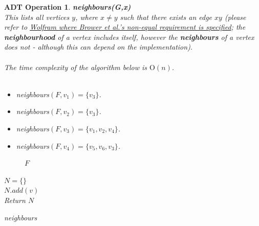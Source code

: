 \documentclass[11pt,reqno]{amsart}
\newtheorem{oper}[thm]{ADT Operation}
\theoremstyle{definition}
\numberwithin{equation}{section}
\begin{document}
\newpage
\begin{oper}
	\textbf{neighbours(G,x)}\\
	This lists all vertices $y$, where $x \neq y$ such that there exists an edge $xy$ (please refer to \href{https://mathworld.wolfram.com/GraphNeighborhood.html}{Wolfram where Brower et al.'s non-equal requirement is specified}; the \textbf{neighbourhood} of a vertex includes itself, however the \textbf{neighbours} of a vertex does not - although this can depend on the implementation).\\
	\\
	The time complexity of the algorithm below is $\mathrm{O}(n)$.\\
	\\
	
	\begin{itemize}
	\item neighbours$(F,v_1) =\{v_3\}$.
	\item neighbours$(F,v_2) = \{v_3\}$.
	\item neighbours$(F,v_3) = \{v_1,v_2,v_4\}$.
	\item neighbours$(F,v_4) = \{v_5,v_6,v_3\}$.
\end{itemize}

	\begin{figure}[h!]
	\caption{$F$}
	\label{fig:Dupe2}
\end{figure}
\pagebreak
\begin{algorithm}[H]
	\SetAlgoLined
	$N=\{\}$\\
	{
		{
				$N.add(v)$\\
			}
	}
	Return $N$
	\caption{neighbours}
\end{algorithm}


\end{oper}
\end{document}
